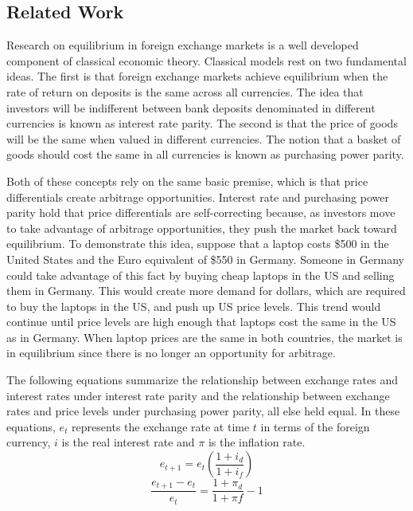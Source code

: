 \documentclass{sig-alternate-05-2015}
\begin{document}
\subsection{Related Work}
Research on equilibrium in foreign exchange markets is a well developed component of classical economic theory. Classical models rest on two fundamental ideas. The first is that foreign exchange markets achieve equilibrium when the rate of return on deposits is the same across all currencies. The idea that investors will be indifferent between bank deposits denominated in different currencies is known as interest rate parity. The second is that the price of goods will be the same when valued in different currencies. The notion that a basket of goods should cost the same in all currencies is known as purchasing power parity.
\par{} Both of these concepts rely on the same basic premise, which is that price differentials create arbitrage opportunities. Interest rate and purchasing power parity hold that price differentials are self-correcting because, as investors move to take advantage of arbitrage opportunities, they push the market back toward equilibrium. To demonstrate this idea, suppose that a laptop costs \$500 in the United States and the Euro equivalent of \$550 in Germany. Someone in Germany could take advantage of this fact by buying cheap laptops in the US and selling them in Germany. This would create more demand for dollars, which are required to buy the laptops in the US, and push up US price levels. This trend would continue until price levels are high enough that laptops cost the same in the US as in Germany. When laptop prices are the same in both countries, the market is in equilibrium since there is no longer an opportunity for arbitrage.
\par{} The following equations summarize the relationship between exchange rates and interest rates under interest rate parity and the relationship between exchange rates and price levels under purchasing power parity, all else held equal. In these equations, $e_{t}$ represents the exchange rate at time $t$ in terms of the foreign currency, $i$ is the real interest rate and $\pi$ is the inflation rate. 
\begin{equation}
e_{t+1} = e_{t} \left( \frac{1+i_{d}}{1+i_{f}} \right)
\end{equation}
\begin{equation}
\frac{e_{t+1}-e_{t}}{e_{t}} = \frac{1+\pi_{d}}{1+\pi{f}} - 1
\end{equation}
\end{document}
